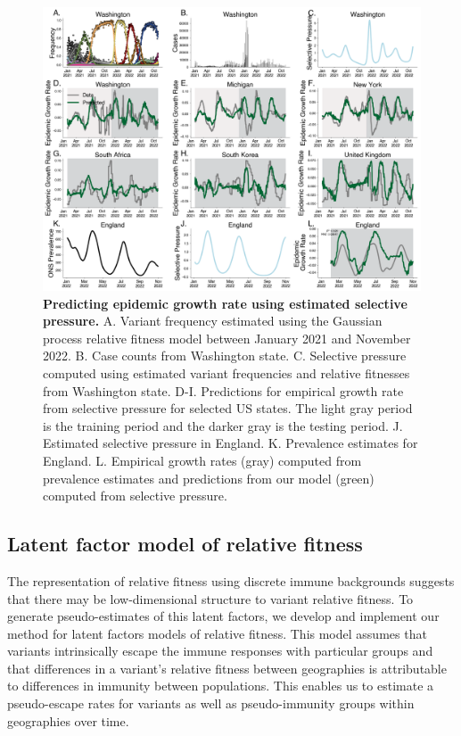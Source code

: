 \documentclass[11pt,oneside,letterpaper]{article}
\begin{document}
\begin{figure}[h]
    \centering
    \includegraphics[width=1.0\linewidth]{./figures/selective_pressure_prediction.png}
    \caption{
      \textbf{Predicting epidemic growth rate using estimated selective pressure.}
      A. Variant frequency estimated using the Gaussian process relative fitness model between January 2021 and November 2022.
      B. Case counts from Washington state.
      C. Selective pressure computed using estimated variant frequencies and relative fitnesses from Washington state.
      D-I. Predictions for empirical growth rate from selective pressure for selected US states.
      The light gray period is the training period and the darker gray is the testing period.
      J. Estimated selective pressure in England.
      K. Prevalence estimates for England.
      L. Empirical growth rates (gray) computed from prevalence estimates and predictions from our model (green) computed from selective pressure.
    }
    \label{fig:selective_pressure_prediction}
\end{figure}

\subsection*{Latent factor model of relative fitness}

The representation of relative fitness using discrete immune backgrounds suggests that there may be low-dimensional structure to variant relative fitness.
To generate pseudo-estimates of this latent factors, we develop and implement our method for latent factors models of relative fitness.
This model assumes that variants intrinsically escape the immune responses with particular groups and that differences in a variant's relative fitness between geographies is attributable to differences in immunity between populations.
This enables us to estimate a pseudo-escape rates for variants as well as pseudo-immunity groups within geographies over time.
\end{document}
